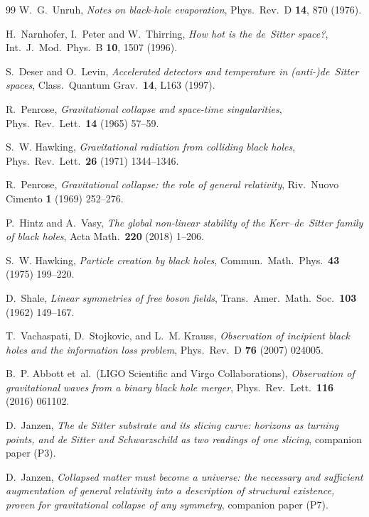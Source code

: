 \documentclass[11pt,a4paper]{article}
\theoremstyle{plain}
\theoremstyle{remark}
\begin{document}
\begin{thebibliography}{99}
W.~G.~Unruh, \emph{Notes on black-hole evaporation}, Phys.\ Rev.\ D \textbf{14}, 870 (1976).

H.~Narnhofer, I.~Peter and W.~Thirring, \emph{How hot is the de~Sitter space?}, Int.\ J.\ Mod.\ Phys.\ B \textbf{10}, 1507 (1996).

S.~Deser and O.~Levin, \emph{Accelerated detectors and temperature in (anti-)de~Sitter spaces}, Class.\ Quantum Grav.\ \textbf{14}, L163 (1997).

R.~Penrose,
\emph{Gravitational collapse and space-time singularities},
Phys.~Rev.~Lett.~\textbf{14} (1965) 57--59.

S.~W. Hawking,
\emph{Gravitational radiation from colliding black holes},
Phys.~Rev.~Lett.~\textbf{26} (1971) 1344--1346.

R.~Penrose,
\emph{Gravitational collapse: the role of general relativity},
Riv.~Nuovo Cimento \textbf{1} (1969) 252--276.

P.~Hintz and A.~Vasy,
\emph{The global non-linear stability of the Kerr--de~Sitter family of black holes},
Acta Math.~\textbf{220} (2018) 1--206.

S.~W. Hawking,
\emph{Particle creation by black holes},
Commun.~Math.~Phys.~\textbf{43} (1975) 199--220.

D.~Shale,
\emph{Linear symmetries of free boson fields},
Trans.~Amer.~Math.~Soc.~\textbf{103} (1962) 149--167.

T.~Vachaspati, D.~Stojkovic, and L.~M. Krauss,
\emph{Observation of incipient black holes and the information loss problem},
Phys.~Rev.~D \textbf{76} (2007) 024005.

B.~P. Abbott et~al.\ (LIGO Scientific and Virgo Collaborations),
\emph{Observation of gravitational waves from a binary black hole merger},
Phys.~Rev.~Lett.~\textbf{116} (2016) 061102.

D.~Janzen,
\emph{The de Sitter substrate and its slicing curve: horizons as turning points, and de Sitter and Schwarzschild as two readings of one slicing}, companion paper (P3).

 D.~Janzen, \emph{Collapsed matter must become a universe: the necessary and sufficient augmentation of general relativity into a description of structural existence, proven for gravitational collapse of any symmetry}, companion paper (P7).


\end{thebibliography}
\end{document}
